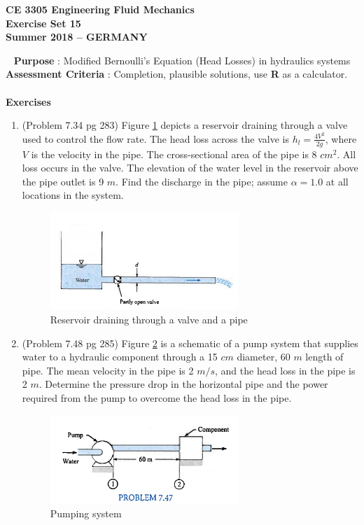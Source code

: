 \documentclass[12pt]{article}
\begin{document}
\begingroup
\begin{center}
{\textbf{{ CE 3305 Engineering Fluid Mechanics} \\ Exercise Set 15 \\ Summer 2018 -- GERMANY} }
\end{center}
\endgroup
\begingroup
~\newline
\textbf{Purpose} :  Modified Bernoulli's Equation (Head Losses) in hydraulics systems \\
\textbf{Assessment Criteria} : Completion, plausible solutions, use \textbf{R} as a calculator. \\~\\
\textbf{Exercises}

\begin{enumerate}
\item (Problem 7.34 pg 283)  Figure \ref{fig:TankDrainb} depicts a reservoir draining through a valve used to control the flow rate.
The head loss across the valve is $h_l = \frac{4V^2}{2g}$, where $V$ is the velocity in the pipe.
The cross-sectional area of the pipe is 8 $cm^2$.
All loss occurs in the valve.
The elevation of the water level in the reservoir above the pipe outlet is 9 $m$.
Find the discharge in the pipe; assume $\alpha = 1.0$ at all locations in the system.
\begin{figure}[h!] %
   \centering
   \includegraphics[width=2.8in]{TankDrainb.jpg} 
   \caption{Reservoir draining through a valve and a pipe}
   \label{fig:TankDrainb}
\end{figure}
\item (Problem 7.48 pg 285) Figure \ref{fig:PumpLoss} is a schematic of a pump system that supplies water to a hydraulic component through a 15 $cm$ diameter, 60 $m$ length of pipe.
The mean velocity in the pipe is 2 $m/s$, and the head loss in the pipe is 2 $m$.   
Determine the pressure drop in the horizontal pipe and the power required from the pump to overcome the head loss in the pipe.
\begin{figure}[h!] %
   \centering
   \includegraphics[width=2.8in]{PumpLoss.jpg} 
   \caption{Pumping system}
   \label{fig:PumpLoss}
\end{figure}

\end{enumerate}
\end{document}
